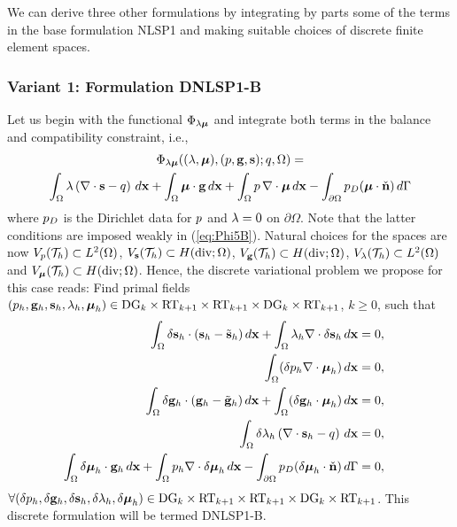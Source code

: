 We can derive three other formulations by integrating by parts some 
of the terms in the base formulation NLSP1 and making suitable 
choices of discrete finite element spaces. 

\subsubsection{Variant 1: Formulation DNLSP1-B}

Let us begin with the functional $\Phi_{\lambda \boldsymbol{\mu}}$ and integrate
both terms in the balance and compatibility constraint, i.e.,
\begin{multline}
\Phi_{\lambda \boldsymbol{\mu}}((\lambda, \boldsymbol{\mu}), (p, \mathbf{g}, \mathbf{s}); q, \Omega) =  \\
 \int_{\Omega}  \lambda \left ( \nabla \cdot \mathbf{s} - q \right ) \, d\mathbf{x} + 
\int_{\Omega} \boldsymbol{\mu} \cdot \mathbf{g}\,d\mathbf{x}  + \int_{\Omega} p \, \nabla \cdot \boldsymbol{\mu} \,d\mathbf{x}
- \int_{\partial{\Omega}} {p_D (\boldsymbol{\mu} \cdot \check{\mathbf{n}})} \, d\Gamma \label{eq:Phi5B}
\end{multline}
where $p_D$ is the Dirichlet data for $p$ and $\lambda = 0$ on $\partial{\Omega}$.
Note that the latter conditions are imposed weakly in (\ref{eq:Phi5B}).
Natural choices for the spaces are now
$V_{p}(\mathcal{T}_h) \subset L^2(\Omega)$, $V_{\mathbf{s}}(\mathcal{T}_h) \subset H(\text{div};\Omega)$, $V_{\mathbf{g}}(\mathcal{T}_h) \subset H(\text{div};\Omega)$, $V_{\lambda}(\mathcal{T}_h) \subset L^2(\Omega)$
and $V_{\boldsymbol{\mu}}(\mathcal{T}_h) \subset H(\text{div};\Omega)$.
Hence, the discrete variational problem we propose for this case reads:
Find primal fields
$(p_h,\mathbf{g}_h, \mathbf{s}_h, \lambda_h, \boldsymbol{\mu}_h ) \in \text{DG}_{k} \times \text{RT}_{k+1} \times \text{RT}_{k+1}
\times \text{DG}_{k} \times \text{RT}_{k+1}$, $k \ge 0$, such that
\begin{equation}
        \begin{aligned}
                \int_{\Omega}  \delta \mathbf{s}_h \cdot (\mathbf{s}_h - \tilde{\mathbf{s}}_h) \, d\mathbf{x} +
                \int_{\Omega} {\lambda_h \nabla \cdot \delta \mathbf{s}_h } \, d\mathbf{x} & = 0, & \\
                 \int_{\Omega}(\delta p_h \nabla \cdot \boldsymbol{\mu}_h  ) \, d\mathbf{x} & = 0, &\\
                \int_{\Omega}  \delta \mathbf{g}_h \cdot (\mathbf{g}_h - \tilde{\mathbf{g}}_h) \, d\mathbf{x}  + \int_{\Omega} (\delta \mathbf{g}_h \cdot \boldsymbol{\mu}_h) \, d\mathbf{x} & = 0, &\\
                \int_{\Omega} \delta \lambda_h \left ( \nabla \cdot  \mathbf{s}_h  -  q \right ) \, d\mathbf{x} & = 0, & \\
                \int_{\Omega}{ \delta \boldsymbol{\mu}_h \cdot \mathbf{g}_h}\, d\mathbf{x} +  \int_{\Omega}{p_h \nabla  \cdot \delta \boldsymbol{\mu}_h}\, d\mathbf{x}
              - \int_{\partial{\Omega}}{ p_D (\delta{\boldsymbol{\mu}}_h \cdot \check{\mathbf{n}})}\,d\Gamma & = 0, &
        \end{aligned}
\end{equation}
$\forall (\delta p_h,\delta\mathbf{g}_h, \delta\mathbf{s}_h, \delta\lambda_h, \delta\boldsymbol{\mu}_h ) \in  \text{DG}_{k} \times \text{RT}_{k+1} \times \text{RT}_{k+1}
\times \text{DG}_{k} \times \text{RT}_{k+1}$.
This discrete formulation will be termed DNLSP1-B. 

